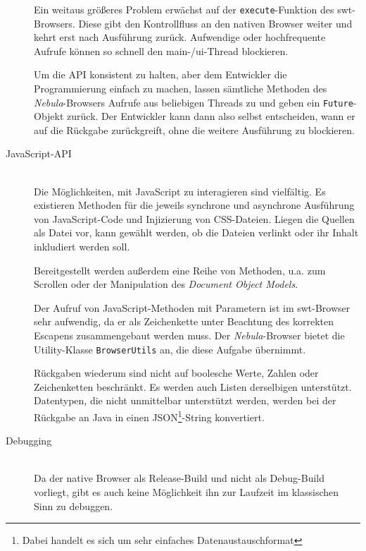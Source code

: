 \begin{description}
  Ein weitaus größeres Problem erwächst auf der \texttt{execute}-Funktion des \gls{swt}-Browsers. Diese gibt den Kontrollfluss an den nativen Browser weiter und kehrt erst nach Ausführung zurück. Aufwendige oder hochfrequente Aufrufe können so schnell den main-/\acrshort{ui}-Thread blockieren.
  
  Um die API konsistent zu halten, aber dem Entwickler die Programmierung einfach zu machen, lassen sämtliche Methoden des \textit{Nebula}-Browsers Aufrufe aus beliebigen Threads zu und geben ein \texttt{Future}-Objekt zurück. Der Entwickler kann dann also selbst entscheiden, wann er auf die Rückgabe zurückgreift, ohne die weitere Ausführung zu blockieren.
  
  \item[JavaScript-API] \hfill \\
  Die Möglichkeiten, mit JavaScript zu interagieren sind vielfältig. Es existieren Methoden für die jeweils synchrone und asynchrone Ausführung von JavaScript-Code und Injizierung von CSS-Dateien. Liegen die Quellen als Datei vor, kann gewählt werden, ob die Dateien verlinkt oder ihr Inhalt inkludiert werden soll.
  
  Bereitgestellt werden außerdem eine Reihe von Methoden, u.a. zum Scrollen oder der Manipulation des \textit{Document Object Models}.
          
  Der Aufruf von JavaScript-Methoden mit Parametern ist im \gls{swt}-Browser sehr aufwendig, da er als Zeichenkette unter Beachtung des korrekten Escapens zusammengebaut werden muss. Der \textit{Nebula}-Browser bietet die Utility-Klasse \texttt{BrowserUtils} an, die diese Aufgabe übernimmt.
  
  Rückgaben wiederum sind nicht auf boolesche Werte, Zahlen oder Zeichenketten beschränkt. Es werden auch Listen derselbigen unterstützt. Datentypen, die nicht unmittelbar unterstützt werden, werden bei der Rückgabe an Java in einen JSON\footnote{Dabei handelt es sich um sehr einfaches Datenaustauschformat}-String konvertiert.
    
  \item[Debugging] \hfill \\
  Da der native Browser als Release-Build und nicht als Debug-Build vorliegt, gibt es auch keine Möglichkeit ihn zur Laufzeit im klassischen Sinn zu debuggen.
  

\end{description}
